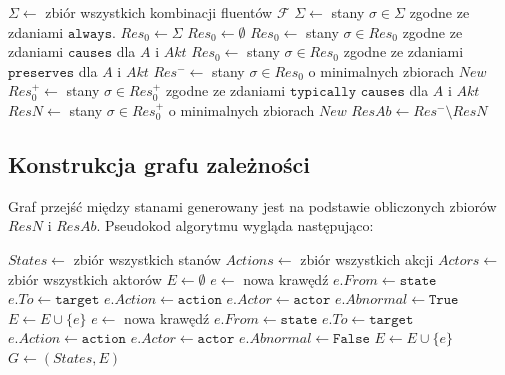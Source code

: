 \documentclass{article}
\begin{document}
\begin{algorithm}[H]
\begin{algorithmic}
\State $\Sigma \gets $ zbiór wszystkich kombinacji fluentów $\mathcal{F}$
\State $\Sigma \gets$ stany $\sigma \in \Sigma$ zgodne ze zdaniami $\texttt{always}$.
\State $Res_0 \gets \Sigma$
	\State $Res_0 \gets \emptyset$ 
\EndIf
\State $Res_0 \gets$ stany $\sigma \in Res_0$ zgodne ze zdaniami $\texttt{causes}$ dla $A$ i $Akt$
\State $Res_0 \gets$ stany $\sigma \in Res_0$ zgodne ze zdaniami $\texttt{preserves}$ dla $A$ i $Akt$
\State $Res^- \gets$ stany $\sigma \in Res_0$ o minimalnych zbiorach $New$
\State $Res^+_0 \gets$ stany $\sigma \in Res^+_0$ zgodne ze zdaniami $\texttt{typically causes}$ dla $A$ i $Akt$
\State $ResN \gets$ stany $\sigma \in Res^+_0$ o minimalnych zbiorach $New$
\State $ResAb \gets Res^- \setminus ResN$ 
\end{algorithmic}
\end{algorithm}

\newpage
\subsection{Konstrukcja grafu zależności}

Graf przejść między stanami generowany jest na podstawie obliczonych zbiorów $ResN$ i $ResAb$. Pseudokod algorytmu wygląda następująco:

\begin{algorithm}[H]
\begin{algorithmic}
\State $States \gets $ zbiór wszystkich stanów
\State $Actions \gets $ zbiór wszystkich akcji
\State $Actors \gets $ zbiór wszystkich aktorów
\State $E \gets \emptyset$
				\State $e \gets$ nowa krawędź
				\State $e.From \gets \texttt{state}$
				\State $e.To \gets \texttt{target}$
				\State $e.Action \gets \texttt{action}$
				\State $e.Actor \gets \texttt{actor}$
				\State $e.Abnormal \gets \texttt{True}$
				\State $E \gets E \cup \{e\}$
			\EndFor
				\State $e \gets$ nowa krawędź
				\State $e.From \gets \texttt{state}$
				\State $e.To \gets \texttt{target}$
				\State $e.Action \gets \texttt{action}$
				\State $e.Actor \gets \texttt{actor}$
				\State $e.Abnormal \gets \texttt{False}$
				\State $E \gets E \cup \{e\}$
			\EndFor
		\EndFor
	\EndFor
\EndFor
\State $G \gets \left(States, E\right)$
\end{algorithmic}
\end{algorithm}
\newpage
\end{document}
